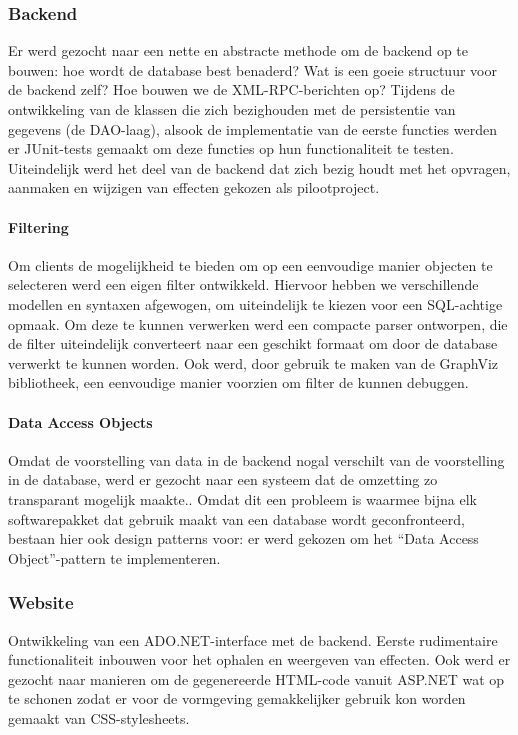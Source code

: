 \subsubsection{Backend}
Er werd gezocht naar een nette en abstracte methode om de backend op te bouwen: hoe wordt de database best benaderd? Wat is een goeie structuur voor de backend zelf? Hoe bouwen we de XML-RPC-berichten op?
Tijdens de ontwikkeling van de klassen die zich bezighouden met de persistentie van gegevens (de DAO-laag), alsook de implementatie van de eerste functies werden er JUnit-tests gemaakt om deze functies op hun functionaliteit te testen.
Uiteindelijk werd het deel van de backend dat zich bezig houdt met het opvragen, aanmaken en wijzigen van effecten gekozen als pilootproject.

\paragraph{Filtering}
Om clients de mogelijkheid te bieden om op een eenvoudige manier objecten te selecteren werd een eigen filter ontwikkeld. Hiervoor hebben we verschillende modellen en syntaxen afgewogen, om uiteindelijk te kiezen voor een SQL-achtige opmaak. Om deze te kunnen verwerken werd een compacte parser ontworpen, die de filter uiteindelijk converteert naar een geschikt formaat om door de database verwerkt te kunnen worden.
Ook werd, door gebruik te maken van de GraphViz bibliotheek, een eenvoudige manier voorzien om filter de kunnen debuggen.

\paragraph{Data Access Objects}
Omdat de voorstelling van data in de backend nogal verschilt van de voorstelling in de database, werd er gezocht naar een systeem dat de omzetting zo transparant mogelijk maakte.. Omdat dit een probleem is waarmee bijna elk softwarepakket dat gebruik maakt van een database wordt geconfronteerd, bestaan hier ook design patterns voor: er werd gekozen om het ``Data Access Object''-pattern te implementeren.

\subsubsection{Website}
Ontwikkeling van een ADO.NET-interface met de backend. Eerste rudimentaire functionaliteit inbouwen voor het ophalen en weergeven van effecten. Ook werd er gezocht naar manieren om de gegenereerde HTML-code vanuit ASP.NET wat op te schonen zodat er voor de vormgeving gemakkelijker gebruik kon worden gemaakt van CSS-stylesheets.

